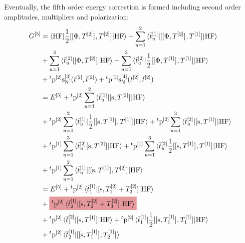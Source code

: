 Eventually, the fifth order energy correction is formed including second order
amplitudes, multipliers and polarization:
\begin{equation}\label{eq:fifth-order-G}
  \begin{aligned}
    G^{[5]} &=
    \braket{\mathrm{HF} | \frac{1}{2}
    \commutator{\commutator{\Phi}{T^{[2]}}}{T^{[2]}}
    | \mathrm{HF}}
    +
    \sum_{u=1}^2\braket{\tbar{u}^{[1]}|
    \commutator{\commutator{\Phi}{T^{[2]}}}{T^{[1]}}
    | \mathrm{HF}}
    \\
    &+
    \sum_{u=1}^3\braket{\tbar{u}^{[2]}|
      \commutator{\Phi}{T^{[2]}}
    | \mathrm{HF}}
    +
    \sum_{u=1}^3\braket{\tbar{u}^{[2]}|
    \frac{1}{2}
    \commutator{\commutator{\Phi}{T^{[1]}}}{T^{[1]}}
    | \mathrm{HF}} \\
    &+ {}^t\p^{[2]}\s_{\mathrm{N}}^{[3]}(\tamp{}^{[2]}, \tbar{}^{[2]})
    + {}^t\p^{[1]}\s_{\mathrm{N}}^{[4]}(\tamp{}^{[2]}, \tbar{}^{[2]}) \\
    &= E^{[5]}
    + {}^t\p^{[2]}
    \sum_{u=1}^2\braket{\tbar{u}^{[1]} |
    \commutator{\s}{T^{[2]}} | \mathrm{HF}} \\
    &+ {}^t\p^{[2]}
    \sum_{u=1}^2\braket{\tbar{u}^{[1]} |
    \frac{1}{2}\commutator{\commutator{\s}{T^{[1]}}}{T^{[1]}}
    | \mathrm{HF}}
    + {}^t\p^{[2]}
    \sum_{u=1}^3\braket{ \tbar{u}^{[2]}
                                 | \commutator{\s}{T^{[1]}} | \mathrm{HF}}
    \\
    &+ {}^t\p^{[1]}
    \sum_{u=1}^3\braket{ \tbar{u}^{[2]}
    \commutator{\s}{T^{[2]}} | \mathrm{HF}}
    + {}^t\p^{[1]}
    \sum_{u=1}^3\braket{ \tbar{u}^{[2]}
    \frac{1}{2}\commutator{\commutator{\s}{T^{[1]}}}{T^{[1]}}
    | \mathrm{HF}} \\
    &+ {}^t\p^{[1]}
    \sum_{u=1}^2\braket{\tbar{u}^{[1]} |
    \commutator{\commutator{\s}{T^{[1]}}}{T^{[2]}}
    | \mathrm{HF}}
    \\
  &= E^{[5]}
    + {}^t\p^{[2]}\braket{\tbar{1}^{[1]} | \commutator{\s}{T_1^{[2]} +
    T_2^{[2]}} | \mathrm{HF}} \\
    &+ \highlight{PMS1797}{
    {}^t\p^{[2]}\braket{\tbar{2}^{[1]} | \commutator{\s}{T_2^{[2]} + T_3^{[2]}} | \mathrm{HF}}
    } \\
    &+ {}^t\p^{[2]}\braket{\tbar{1}^{[2]} | \commutator{\s}{T^{[1]}} | \mathrm{HF}}
    + {}^t\p^{[2]}
    \braket{\tbar{1}^{[1]} |
    \frac{1}{2}\commutator{\commutator{\s}{T_1^{[1]}}}{T_1^{[1]}}
    | \mathrm{HF}} \\
    &+ {}^t\p^{[2]}
    \braket{\tbar{2}^{[1]} |
    \commutator{\commutator{\s}{T_1^{[1]}}}{T_2^{[1]}}
}
\end{aligned}
\end{equation}
